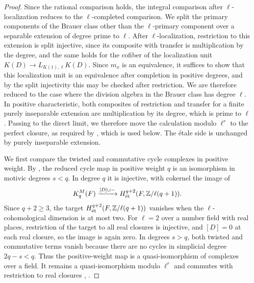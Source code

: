 \begin{proof}
Since the rational comparison holds, the integral comparison after $\ell$-localization reduces to the $\ell$-completed comparison.
We split the primary components of the Brauer class other than the $\ell$-primary component over a separable extension of degree prime to $\ell$.
After $\ell$-localization, restriction to this extension is split injective, since its composite with transfer is multiplication by the degree, and the same holds for the cofiber of the localization unit $K(D)\to L_{K(1),\ell}K(D)$.
Since $m_x$ is an equivalence, it suffices to show that this localization unit is an equivalence after completion in positive degrees, and by the split injectivity this may be checked after restriction.
We are therefore reduced to the case where the division algebra in the Brauer class has degree $\ell$.
In positive characteristic, both composites of restriction and transfer for a finite purely inseparable extension are multiplication by its degree, which is prime to $\ell$.
Passing to the direct limit, we therefore move the calculation modulo $\ell^r$ to the perfect closure, as required by \cite[Theorem 8.2.2]{KahnLevine2010}, which is used below.
The \'etale side is unchanged by purely inseparable extension.

We first compare the twisted and commutative cycle complexes in positive weight.
By \cite[Theorem 8.2.2]{KahnLevine2010}, the reduced cycle map in positive weight $q$ is an isomorphism in motivic degrees $s<q$.
In degree $q$ it is injective, with cokernel the image of
\[
 K_q^M(F)\xrightarrow{[D]\cup-}
 H^{q+2}_{\mathrm{\acute et}}(F,\mathbb Z/\ell(q+1)).
\]
Since $q+2\ge3$, the target $H^{q+2}_{\mathrm{\acute et}}(F,\mathbb Z/\ell(q+1))$ vanishes when the $\ell$-cohomological dimension is at most two.
For $\ell=2$ over a number field with real places, restriction of the target to all real closures is injective, and $[D]=0$ at each real closure, so the image is again zero.
In degrees $s>q$, both twisted and commutative terms vanish because there are no cycles in simplicial degree $2q-s<q$.
Thus the positive-weight map is a quasi-isomorphism of complexes over a field.
It remains a quasi-isomorphism modulo $\ell^r$ and commutes with restriction to real closures \cite[Theorem 6.5.3]{KahnLevine2010}, \cite{Jannsen,Voevodsky}.


\end{proof}
